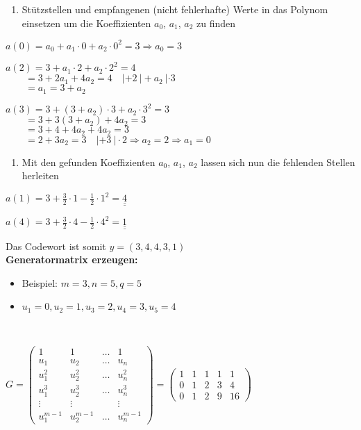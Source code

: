 \begin{enumerate}[leftmargin=*]
\item Stützstellen und empfangenen (nicht fehlerhafte) Werte in das Polynom einsetzen um die Koeffizienten $a_0$, $a_1$, $a_2$ zu finden
\end{enumerate}

$a(0) = a_0 + a_1 \cdot 0 + a_2 \cdot 0^2 = 3 \Rightarrow \boxed{a_0 = 3}$

$a(2) = 3 + a_1 \cdot 2 + a_2 \cdot 2^2 = 4$\\
$\text{}\qquad = 3 + 2a_1 + 4a_2 = 4 \quad |+2 \ | +a_2 \ | \cdot 3$\\
$\text{}\qquad = a_1 = 3 +a_2$

$a(3) = 3 + (3 +a_2) \cdot 3 + a_2 \cdot 3^2 = 3$\\
$\text{}\qquad = 3 + 3(3 +a_2) + 4a_2 = 3$\\
$\text{}\qquad = 3 + 4 + 4a_2 + 4a_2 = 3$\\
$\text{}\qquad = 2 + 3a_2 = 3 \quad |+3 \ | \cdot 2 \Rightarrow \boxed{a_2 = 2} \Rightarrow \boxed{a_1 = 0}$\\

\begin{enumerate}[leftmargin=*, label={2.}]
\item Mit den gefunden Koeffizienten $a_0$, $a_1$, $a_2$ lassen sich nun die fehlenden Stellen herleiten
\end{enumerate}

$a(1) = 3 + \frac{3}{2} \cdot 1 - \frac{1}{2} \cdot 1^2 = \underline{\underline{4}}$

$a(4) = 3 + \frac{3}{2} \cdot 4 - \frac{1}{2} \cdot 4^2 = \underline{\underline{1}}$

Das Codewort ist somit $y = (3, 4, 4, 3, 1)$\\

\textbf{Generatormatrix erzeugen:}

\begin{itemize}
\item Beispiel: $m=3, n = 5, q = 5$
\item $u_1 = 0, u_2 = 1, u_3 = 2, u_4 = 3, u_5 = 4$
\end{itemize}\

$G = \begin{pmatrix}
1        & 1      & \dots & 1\\
u_1   & u_2    & \dots & u_n\\
u_1^2  & u_2^2  & \dots & u_n^2\\
u_1^3  & u_2^3  & \dots & u_n^3\\
\vdots & \vdots &  & \vdots\\
u_1^{m-1}  & u_2^{m-1}  & \dots & u_n^{m-1}
\end{pmatrix} = \begin{pmatrix}
1 & 1 & 1 & 1 & 1\\
0 & 1 & 2 & 3 & 4\\
0 & 1 & 2 & 9 & 16
\end{pmatrix}$\
\\

